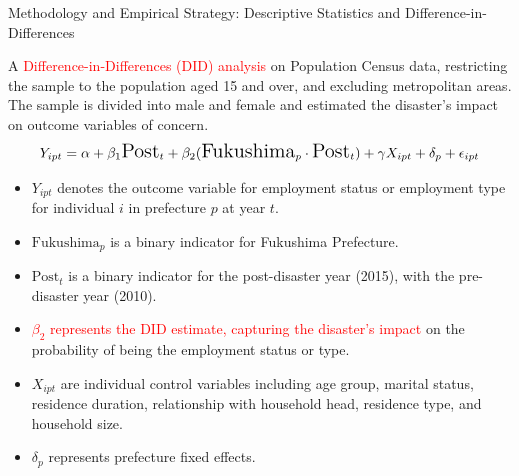 \documentclass[serif, aspectratio=169]{beamer}
\begin{document}
\begin{frame}{Methodology and Empirical Strategy: Descriptive Statistics and  Difference-in-Differences}






\vspace{-0.2cm}
A \textcolor{red}{Difference-in-Differences (DID) analysis} on Population Census data, restricting the sample to the population aged 15 and over, and excluding metropolitan areas. The sample is divided into male and female and estimated the disaster's impact on outcome variables of concern.
\vspace{-0.1cm}
   \begin{equation}
   \Large Y_{ipt} = \alpha + \beta_1 \text{Post}_t + \beta_2 (\text{Fukushima}_p \cdot \text{Post}_t) + \gamma X_{ipt} + \delta_p + \epsilon_{ipt}
   \end{equation}
   \vspace{-0.5cm}
   \begin{itemize}
   \item $Y_{ipt}$ denotes the outcome variable for employment status or employment type for individual $i$ in prefecture $p$ at year $t$.
   \item $\text{Fukushima}_p$ is a binary indicator for Fukushima Prefecture.
   \item $\text{Post}_t$ is a binary indicator for the post-disaster year (2015), with the pre-disaster year (2010).
   \item \textcolor{red}{$\beta_2$ represents the DID estimate, capturing the disaster's impact} on the probability of being the employment status or type.
   \item $X_{ipt}$ are individual control variables including age group, marital status, residence duration, relationship with household head, residence type, and household size.
   \item $\delta_p$ represents prefecture fixed effects.
   \end{itemize}
\end{frame}
\end{document}
